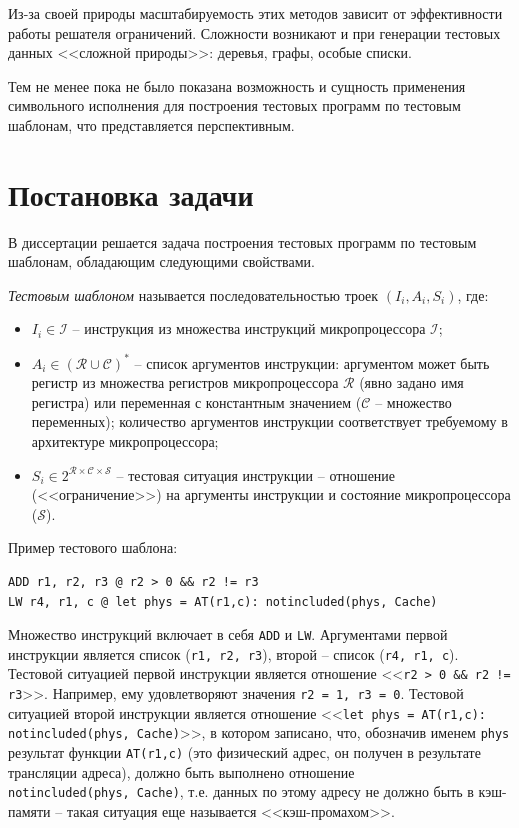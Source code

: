 Из-за своей природы масштабируемость этих методов зависит от
эффективности работы решателя ограничений. Сложности возникают и при
генерации тестовых данных <<сложной природы>>: деревья, графы,
особые списки.

Тем не менее пока не было показана возможность и сущность применения
символьного исполнения для построения тестовых программ по тестовым
шаблонам, что представляется перспективным.

\section{Постановка задачи}

В диссертации решается задача построения тестовых программ по
тестовым шаблонам, обладающим следующими свойствами.

\emph{Тестовым шаблоном} называется последовательностью троек $(I_i,
A_i, S_i)$, где:
\begin{itemize}
  \item $I_i \in \mathcal{I}$ -- инструкция из множества инструкций
микропроцессора $\mathcal{I}$;
  \item $A_i \in (\mathcal{R} \cup \mathcal{C})^*$ -- список аргументов
  инструкции: аргументом может быть регистр из множества регистров
  микропроцессора $\mathcal{R}$ (явно задано имя регистра) или
  переменная с константным значением ($\mathcal{C}$ -- множество
  переменных); количество аргументов инструкции соответствует
  требуемому в архитектуре микропроцессора;
  \item $S_i \in 2^{\mathcal{R} \times \mathcal{C} \times
  \mathcal{S}}$ -- тестовая ситуация инструкции -- отношение
  (<<ограничение>>) на аргументы инструкции и состояние
  микропроцессора ($\mathcal{S}$).
\end{itemize}

Пример тестового шаблона:
\begin{verbatim}
ADD r1, r2, r3 @ r2 > 0 && r2 != r3
LW r4, r1, c @ let phys = AT(r1,c): notincluded(phys, Cache)
\end{verbatim}
Множество инструкций включает в себя \texttt{ADD} и \texttt{LW}.
Аргументами первой инструкции является список (\texttt{r1, r2, r3}),
второй -- список (\texttt{r4, r1, c}). Тестовой ситуацией первой
инструкции является отношение <<\texttt{r2 > 0 \&\& r2 != r3}>>.
Например, ему удовлетворяют значения \texttt{r2 = 1, r3 = 0}.
Тестовой ситуацией второй инструкции является отношение
<<\texttt{let phys = AT(r1,c):\\notincluded(phys, Cache)}>>, в
котором записано, что, обозначив именем \texttt{phys} результат
функции \texttt{AT(r1,c)} (это физический адрес, он получен в
результате трансляции адреса), должно быть выполнено отношение\\
\texttt{notincluded(phys, Cache)}, т.е. данных по этому адресу не
должно быть в кэш-памяти -- такая ситуация еще называется
<<кэш-промахом>>.

